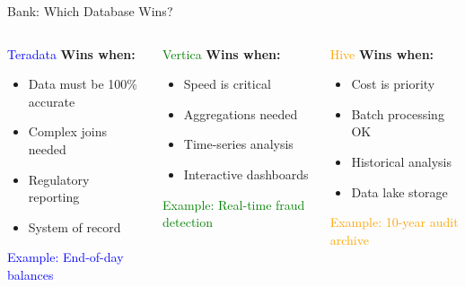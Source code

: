 \documentclass{beamer}
\begin{document}
	
	\begin{frame}{Bank: Which Database Wins?}
		\begin{columns}[T]
			\begin{block}{\textcolor{blue}{Teradata}}
				\textbf{Wins when:}
				\begin{itemize}
					\small
					\item Data must be 100\% accurate
					\item Complex joins needed
					\item Regulatory reporting
					\item System of record
				\end{itemize}
				\vspace{0.2cm}
				\textcolor{blue}{Example: End-of-day balances}
			\end{block}
			
			\begin{block}{\textcolor{green}{Vertica}}
				\textbf{Wins when:}
				\begin{itemize}
					\small
					\item Speed is critical
					\item Aggregations needed
					\item Time-series analysis
					\item Interactive dashboards
				\end{itemize}
				\vspace{0.2cm}
				\textcolor{green}{Example: Real-time fraud detection}
			\end{block}
			
			\begin{block}{\textcolor{orange}{Hive}}
				\textbf{Wins when:}
				\begin{itemize}
					\small
					\item Cost is priority
					\item Batch processing OK
					\item Historical analysis
					\item Data lake storage
				\end{itemize}
				\vspace{0.2cm}
				\textcolor{orange}{Example: 10-year audit archive}
			\end{block}
		\end{columns}
	\end{frame}
	
\end{document}
